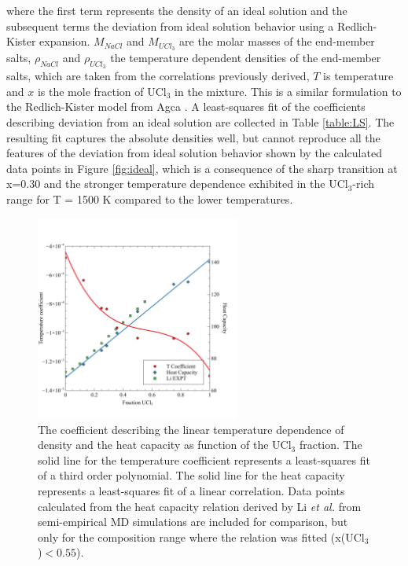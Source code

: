 \documentclass[preprint,3p,10pt,onecolumn,number,sort&compress]{elsarticle}
\begin{document}
\noindent where the first term represents the density of an ideal solution and the subsequent terms the deviation from ideal solution behavior using a Redlich-Kister expansion. $M_{NaCl}$ and $M_{UCl_3}$ are the molar masses of the end-member salts, $\rho_{NaCl}$ and $\rho_{UCl_3}$ the temperature dependent densities of the end-member salts, which are taken from the correlations previously derived, $T$ is temperature and $x$ is the mole fraction of UCl$_3$ in the mixture. This is a similar formulation to the Redlich-Kister model from Agca \cite{agca2022}. A least-squares fit of the coefficients describing deviation from an ideal solution are collected in Table \ref{table:LS}. 
 The resulting fit captures the absolute densities well, but cannot reproduce all the features of the deviation from ideal solution behavior shown by the calculated data points in Figure \ref{fig:ideal}, which is a consequence of the sharp transition at x=0.30 and the stronger temperature dependence exhibited in the UCl$_3$-rich range for T = 1500 K compared to the lower temperatures. 

\begin{figure}[htb]
\centering
\includegraphics[width=0.6\textwidth]{fig8.pdf}
\caption{The coefficient describing the linear temperature dependence of density and the heat capacity as function of the UCl$_3$ fraction. The solid line for the temperature coefficient represents a least-squares fit of a third order polynomial. The solid line for the heat capacity represents a least-squares fit of a linear correlation. {\color{red}Data points calculated from the heat capacity relation derived by Li \textit{et al.} \cite{Li2020} from semi-empirical MD simulations are included for comparison, but only for the composition range where the relation was fitted (x(UCl$_3$)$<0.55$).}}
\label{fig:TandCp}
\end{figure}
\end{document}
